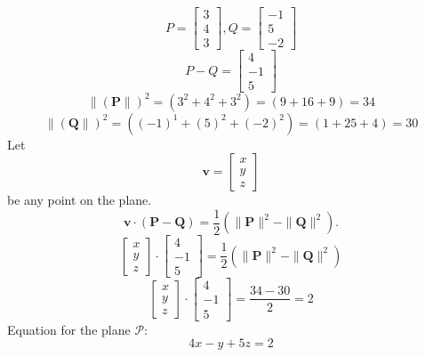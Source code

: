 \begin{enumerate}
    
\[
P =
\begin{bmatrix}
    3 \\ 4 \\ 3
\end{bmatrix}, Q = \begin{bmatrix}
    -1 \\ 5 \\ -2
\end{bmatrix}
\]
\[
P - Q = \begin{bmatrix}
    4 \\ -1 \\ 5
\end{bmatrix}
\]
\[
\|(\mathbf{P}\|)^2 = (3^2+4^2+3^2) = (9+16+9) = 34
\]
\[
\|(\mathbf{Q}\|)^2 = ((-1)^1+(5)^2+(-2)^2) = (1+25+4) = 30
\]
Let \[
 \mathbf{v} = \begin{bmatrix}
    x \\ y \\ z
\end{bmatrix}
\]
be any point on the plane.
\[
    \mathbf{v} \cdot (\mathbf{P} - \mathbf{Q}) = \frac{1}{2} \left(\|\mathbf{P}\|^2 - \|\mathbf{Q}\|^2\right).
\]
 \[
  \begin{bmatrix}
    x \\ y \\ z
\end{bmatrix} \cdot  \begin{bmatrix}
    4 \\ -1 \\ 5
\end{bmatrix} =  \frac{1}{2} \left(\|\mathbf{P}\|^2 - \|\mathbf{Q}\|^2\right)
\]
 \[
  \begin{bmatrix}
    x \\ y \\ z
\end{bmatrix} \cdot  \begin{bmatrix}
    4 \\ -1 \\ 5
\end{bmatrix} =  \frac{34-30}{2}  = 2
\]
Equation for the plane $\mathcal{P}:$
\[
4x - y + 5z = 2
\]
\end{enumerate}



